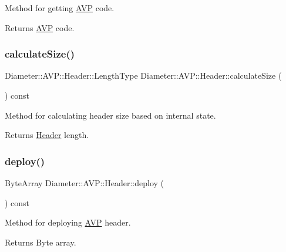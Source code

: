 Method for getting \hyperlink{classDiameter_1_1AVP}{A\+VP} code. 

\begin{DoxyReturn}{Returns}
\hyperlink{classDiameter_1_1AVP}{A\+VP} code. 
\end{DoxyReturn}
\mbox{\label{classDiameter_1_1AVP_1_1Header_a6bffec09d8dd172535828e2927a2a480}} 
\subsubsection{\texorpdfstring{calculate\+Size()}{calculateSize()}}
{\footnotesize\ttfamily Diameter\+::\+A\+V\+P\+::\+Header\+::\+Length\+Type Diameter\+::\+A\+V\+P\+::\+Header\+::calculate\+Size (\begin{DoxyParamCaption}{ }\end{DoxyParamCaption}) const}



Method for calculating header size based on internal state. 

\begin{DoxyReturn}{Returns}
\hyperlink{classDiameter_1_1AVP_1_1Header}{Header} length. 
\end{DoxyReturn}
\mbox{\label{classDiameter_1_1AVP_1_1Header_adb165b56a7160803480621b3789c972a}} 
\subsubsection{\texorpdfstring{deploy()}{deploy()}\hspace{0.1cm}{\footnotesize\ttfamily [1/2]}}
{\footnotesize\ttfamily Byte\+Array Diameter\+::\+A\+V\+P\+::\+Header\+::deploy (\begin{DoxyParamCaption}{ }\end{DoxyParamCaption}) const}



Method for deploying \hyperlink{classDiameter_1_1AVP}{A\+VP} header. 

\begin{DoxyReturn}{Returns}
Byte array. 
\end{DoxyReturn}
\mbox{\label{classDiameter_1_1AVP_1_1Header_ac56e1a44d35cb41d834581834cf17c25}} 
